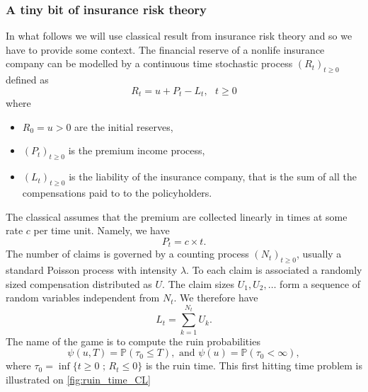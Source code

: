 \subsubsection{A tiny bit of insurance risk theory}\label{sssec:insurance_risk_theory}
In what follows we will use classical result from insurance risk theory and so we have to provide some context. The financial reserve of a nonlife insurance company can be modelled by a continuous time stochastic process $(R_t)_{t\geq0}$ defined as 
\begin{equation}\label{eq:risk_process}
R_t = u + P_t - L_t,\text{ }t\geq0
\end{equation}
where 
\begin{itemize}
  \item $R_0 = u>0$ are the initial reserves,
  \item $(P_t)_{t\geq0}$ is the premium income process,
  \item $(L_t)_{t\geq0}$ is the liability of the insurance company, that is the sum of all the compensations paid to to the policyholders.
\end{itemize}
The classical assumes that the premium are collected linearly in times at some rate $c$ per time unit. Namely, we have 
$$
P_t = c\times t.
$$
The number of claims is governed by a counting process $(N_t)_{t\geq0}$, usually a standard Poisson process with intensity $\lambda$. To each claim is associated a randomly sized compensation distributed as $U$. The claim sizes $U_1,U_2,\ldots$ form a sequence of \iid random variables independent from $N_t$. We therefore have 
$$
L_t = \sum_{k = 1}^{N_t}U_k.
$$
The name of the game is to compute the ruin probabilities 
\begin{equation}\label{eq:ruin_probabilities}
\psi(u,T) = \mathbb{P}(\tau_0 \leq T),\text{ and }\psi(u) = \mathbb{P}(\tau_0 < \infty),
\end{equation} 
where $\tau_0 = \inf\{t\geq0\text{ ; }R_t \leq 0\}$ is the ruin time. This first hitting time problem is illustrated on \cref{fig:ruin_time_CL}
